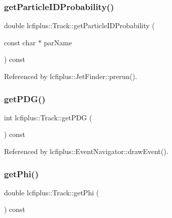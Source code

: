 \mbox{\label{classlcfiplus_1_1Track_a0d9e977005dbd4097fb02544c8eb0ec3}} 
\subsubsection{get\+Particle\+I\+D\+Probability()}
{\footnotesize\ttfamily double lcfiplus\+::\+Track\+::get\+Particle\+I\+D\+Probability (\begin{DoxyParamCaption}\item[{const char $\ast$}]{par\+Name }\end{DoxyParamCaption}) const\hspace{0.3cm}{\ttfamily [inline]}}



Referenced by lcfiplus\+::\+Jet\+Finder\+::prerun().

\mbox{\label{classlcfiplus_1_1Track_a26b8234820237f6a8532e8f978798d0f}} 
\subsubsection{get\+P\+D\+G()}
{\footnotesize\ttfamily int lcfiplus\+::\+Track\+::get\+P\+DG (\begin{DoxyParamCaption}{ }\end{DoxyParamCaption}) const\hspace{0.3cm}{\ttfamily [inline]}}



Referenced by lcfiplus\+::\+Event\+Navigator\+::draw\+Event().

\mbox{\label{classlcfiplus_1_1Track_a844c4f263626cfa1394d0af445e9ff1d}} 
\subsubsection{get\+Phi()}
{\footnotesize\ttfamily double lcfiplus\+::\+Track\+::get\+Phi (\begin{DoxyParamCaption}{ }\end{DoxyParamCaption}) const\hspace{0.3cm}{\ttfamily [inline]}}



